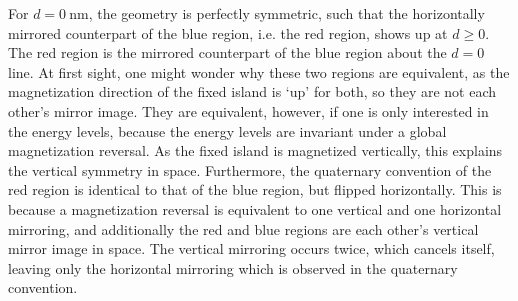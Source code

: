 \documentclass[11pt,a4paper,english]{article}
\begin{document}
For $d=\SI{0}{\nano\metre}$, the geometry is perfectly symmetric, such that the horizontally mirrored counterpart of the blue region, i.e. the red region, shows up at $d \geq 0$. The red region is the mirrored counterpart of the blue region about the $d=0$ line. At first sight, one might wonder why these two regions are equivalent, as the magnetization direction of the fixed island is `up' for both, so they are not each other's mirror image. They are equivalent, however, if one is only interested in the energy levels, because the energy levels are invariant under a global magnetization reversal. As the fixed island is magnetized vertically, this explains the vertical symmetry in space. Furthermore, the quaternary convention of the red region is identical to that of the blue region, but flipped horizontally. This is because a magnetization reversal is equivalent to one vertical and one horizontal mirroring, and additionally the red and blue regions are each other's vertical mirror image in space. The vertical mirroring occurs twice, which cancels itself, leaving only the horizontal mirroring which is observed in the quaternary convention. \par
\end{document}
